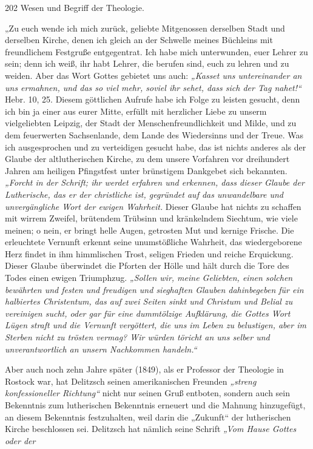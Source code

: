 202 \quad Wesen und Begriff der Theologie.

„Zu euch wende ich mich zurück, geliebte Mitgenossen derselben Stadt und derselben Kirche, denen ich gleich an der Schwelle meines Büchleins mit freundlichem Festgruße entgegentrat. Ich habe mich unterwunden, euer Lehrer zu sein; denn ich weiß, ihr habt Lehrer, die berufen sind, euch zu lehren und zu weiden. Aber das Wort Gottes gebietet uns auch: \emph{„Kasset uns untereinander an uns ermahnen, und das so viel mehr, soviel ihr sehet, dass sich der Tag nahet!“} Hebr. 10, 25. Diesem göttlichen Aufrufe habe ich Folge zu leisten gesucht, denn ich bin ja einer aus eurer Mitte, erfüllt mit herzlicher Liebe zu unserm vielgeliebten Leipzig, der Stadt der Menschenfreundlichkeit und Milde, und zu dem feuerwerten Sachsenlande, dem Lande des Wiedersinns und der Treue. Was ich ausgesprochen und zu verteidigen gesucht habe, das ist nichts anderes als der Glaube der altlutherischen Kirche, zu dem unsere Vorfahren vor dreihundert Jahren am heiligen Pfingstfest unter brünstigem Dankgebet sich bekannten. \emph{„Forcht in der Schrift; ihr werdet erfahren und erkennen, dass dieser Glaube der Lutherische, das er der christliche ist, gegründet auf das unwandelbare und unvergängliche Wort der ewigen Wahrheit.} Dieser Glaube hat nichts zu schaffen mit wirrem Zweifel, brütendem Trübsinn und kränkelndem Siechtum, wie viele meinen; o nein, er bringt helle Augen, getrosten Mut und kernige Frische. Die erleuchtete Vernunft erkennt seine unumstößliche Wahrheit, das wiedergeborene Herz findet in ihm himmlischen Trost, seligen Frieden und reiche Erquickung. Dieser Glaube überwindet die Pforten der Hölle und hält durch die Tore des Todes einen ewigen Triumphzug. \emph{„Sollen wir, meine Geliebten, einen solchen bewährten und festen und freudigen und sieghaften Glauben dahinbegeben für ein halbiertes Christentum, das auf zwei Seiten sinkt und Christum und Belial zu vereinigen sucht, oder gar für eine dummtölzige Aufklärung, die Gottes Wort Lügen straft und die Vernunft vergöttert, die uns im Leben zu belustigen, aber im Sterben nicht zu trösten vermag? Wir würden töricht an uns selber und unverantwortlich an unsern Nachkommen handeln.“}

Aber auch noch zehn Jahre später (1849), als er Professor der Theologie in Rostock war, hat Delitzsch seinen amerikanischen Freunden \emph{„streng konfessioneller Richtung“} nicht nur seinen Gruß entboten, sondern auch sein Bekenntnis zum lutherischen Bekenntnis erneuert und die Mahnung hinzugefügt, an diesem Bekenntnis festzuhalten, weil darin die „Zukunft“ der lutherischen Kirche beschlossen sei. Delitzsch hat nämlich seine Schrift \emph{„Vom Hause Gottes oder der}